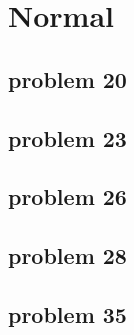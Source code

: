 \section{Normal}

\subsection{problem 20}

\subsection{problem 23}

\subsection{problem 26}

\subsection{problem 28}

\subsection{problem 35}

